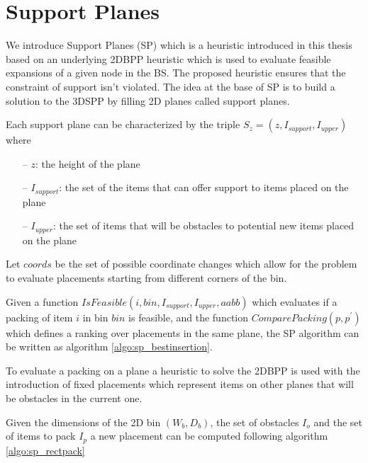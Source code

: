 \section{Support Planes}
\label{sec:support_planes}%
We introduce Support Planes (SP) which is a heuristic introduced in this thesis based on an underlying 2DBPP heuristic which is used to evaluate feasible expansions of a given node in the BS.
The proposed heuristic ensures that the constraint of support isn't violated.
The idea at the base of SP is to build a solution to the 3DSPP by filling 2D planes called support planes.

Each support plane can be characterized by the triple $S_z = (z, I_{support}, I_{upper})$ where
\begin{itemize}
    \item[--] $z$: the height of the plane 
    \item[--] $I_{support}$: the set of the items that can offer support to items placed on the plane
    \item[--] $I_{upper}$: the set of items that will be obstacles to potential new items placed on the plane %
\end{itemize}%

Let $coords$ be the set of possible coordinate changes which allow for the problem to evaluate placements starting from different corners of the bin. %

Given a function $IsFeasible(i, bin, I_{support}, I_{upper}, aabb)$ which evaluates if a packing of item $i$ in bin $bin$ is feasible,
and the function $ComparePacking(p, p^\prime)$ which defines a ranking over placements in the same plane,
the SP algorithm can be written as algorithm \ref{algo:sp_bestinsertion}.



To evaluate a packing on a plane a heuristic to solve the 2DBPP is used with the introduction of fixed placements which represent items on other planes that will be obstacles in the current one.


Given the dimensions of the 2D bin $(W_b, D_b)$, the set of obstacles $I_{o}$ and the set of items to pack $I_{p}$ a new placement can be computed following algorithm \ref{algo:sp_rectpack}

